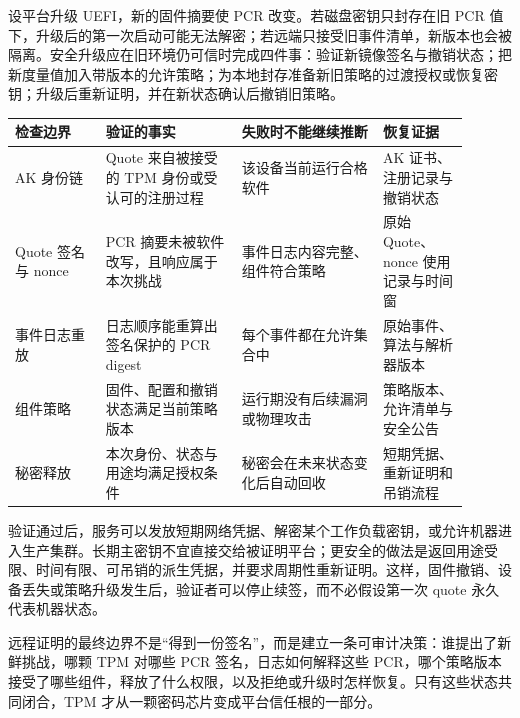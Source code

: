 
设平台升级 UEFI，新的固件摘要使 PCR 改变。若磁盘密钥只封存在旧 PCR 值下，升级后的第一次启动可能无法解密；若远端只接受旧事件清单，新版本也会被隔离。安全升级应在旧环境仍可信时完成四件事：验证新镜像签名与撤销状态；把新度量值加入带版本的允许策略；为本地封存准备新旧策略的过渡授权或恢复密钥；升级后重新证明，并在新状态确认后撤销旧策略。

\begin{longtable}{L{0.18\linewidth}L{0.27\linewidth}L{0.28\linewidth}L{0.17\linewidth}}
\toprule
检查边界 & 验证的事实 & 失败时不能继续推断 & 恢复证据 \\
\midrule
AK 身份链 & Quote 来自被接受的 TPM 身份或受认可的注册过程 & 该设备当前运行合格软件 & AK 证书、注册记录与撤销状态 \\\tablerowrule
Quote 签名与 nonce & PCR 摘要未被软件改写，且响应属于本次挑战 & 事件日志内容完整、组件符合策略 & 原始 Quote、nonce 使用记录与时间窗 \\\tablerowrule
事件日志重放 & 日志顺序能重算出签名保护的 PCR digest & 每个事件都在允许集合中 & 原始事件、算法与解析器版本 \\\tablerowrule
组件策略 & 固件、配置和撤销状态满足当前策略版本 & 运行期没有后续漏洞或物理攻击 & 策略版本、允许清单与安全公告 \\\tablerowrule
秘密释放 & 本次身份、状态与用途均满足授权条件 & 秘密会在未来状态变化后自动回收 & 短期凭据、重新证明和吊销流程 \\
\bottomrule
\end{longtable}


验证通过后，服务可以发放短期网络凭据、解密某个工作负载密钥，或允许机器进入生产集群。长期主密钥不宜直接交给被证明平台；更安全的做法是返回用途受限、时间有限、可吊销的派生凭据，并要求周期性重新证明。这样，固件撤销、设备丢失或策略升级发生后，验证者可以停止续签，而不必假设第一次 quote 永久代表机器状态。

远程证明的最终边界不是“得到一份签名”，而是建立一条可审计决策：谁提出了新鲜挑战，哪颗 TPM 对哪些 PCR 签名，日志如何解释这些 PCR，哪个策略版本接受了哪些组件，释放了什么权限，以及拒绝或升级时怎样恢复。只有这些状态共同闭合，TPM 才从一颗密码芯片变成平台信任根的一部分。
